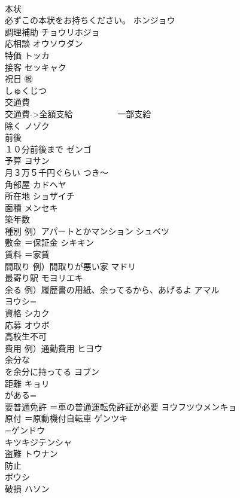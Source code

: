 \documentclass[8pt]{extreport}
\begin{document}
\begin{CJK}{UTF8}{min}
\\	本状 
\\	必ずこの本状をお持ちください。	ホンジョウ 
\\	調理補助	チョウリホジョ 
\\	応相談	オウソウダン 
\\	特価	トッカ 
\\	接客	セッキャク 
\\	祝日 ㊗
\\	しゅくじつ 
\\	交通費 
\\	交通費->全額支給 　　　　　一部支給	
\\	除く	ノゾク 
\\	前後 
\\	１０分前後まで	ゼンゴ 
\\	予算	ヨサン 
\\	月３万５千円ぐらい	つき〜 
\\	角部屋	カドヘヤ 
\\	所在地	ショザイチ 
\\	面積	メンセキ 
\\	築年数	
\\	種別 例）アパートとかマンション	シュベツ 
\\	敷金 ＝保証金	シキキン 
\\	賃料 ＝家賃	
\\	間取り 例）間取りが悪い家	マドリ 
\\	最寄り駅	モヨリエキ 
\\	余る 例）履歴書の用紙、余ってるから、あげるよ	アマル 
\\	ヨウシ=
\\	資格	シカク 
\\	応募	オウボ 
\\	高校生不可	
\\	費用 例）通勤費用	ヒヨウ 
\\	余分な 
\\	を余分に持ってる	ヨブン 
\\	距離	キョリ 
\\	がある=
\\	要普通免許 ＝車の普通運転免許証が必要	ヨウフツウメンキョ 
\\	原付 ＝原動機付自転車	ゲンツキ 
\\	=ゲンドウ
\\	キツキジテンシャ
\\	盗難	トウナン 
\\	防止	
\\	ボウシ
\\	破損	ハソン 

\end{CJK}
\end{document}
